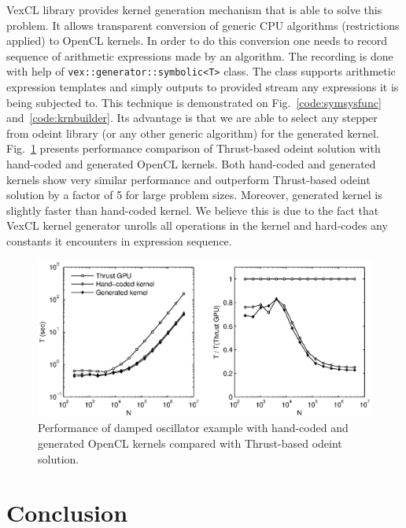 \documentclass[1p]{elsarticle}
\newcommand{\code}[1]{\lstinline|#1|}
\newcommand{\figref}[1]{Fig.~\ref{#1}}
\begin{document}
VexCL library provides kernel generation mechanism that is able to solve this
problem. It allows transparent conversion of generic CPU algorithms
(restrictions applied) to OpenCL kernels. In order to do this conversion one
needs to record sequence of arithmetic expressions made by an algorithm.  The
recording is done with help of \code{vex::generator::symbolic<T>} class. The
class supports arithmetic expression templates and simply outputs to provided
stream any expressions it is being subjected to. This technique is demonstrated
on \figref{code:symsysfunc} and~\ref{code:krnbuilder}. Its advantage is that we
are able to select any stepper from odeint library (or any other generic
algorithm) for the generated kernel. \figref{fig:genkernel} presents
performance comparison of Thrust-based odeint solution with hand-coded and
generated OpenCL kernels. Both hand-coded and generated kernels show very
similar performance and outperform Thrust-based odeint solution by a factor of
5 for large problem sizes. Moreover, generated kernel is slightly faster than
hand-coded kernel. We believe this is due to the fact that VexCL kernel
generator unrolls all operations in the kernel and hard-codes any constants it
encounters in expression sequence.

\begin{figure}[p]
    \begin{center}
        \includegraphics[width=\textwidth]{data/damped_oscillator/genkernel}
    \end{center}
    \caption{Performance of damped oscillator example with hand-coded and
    generated OpenCL kernels compared with Thrust-based odeint solution.}
    \label{fig:genkernel}
\end{figure}








% 
%
\section{Conclusion}
\end{document}
